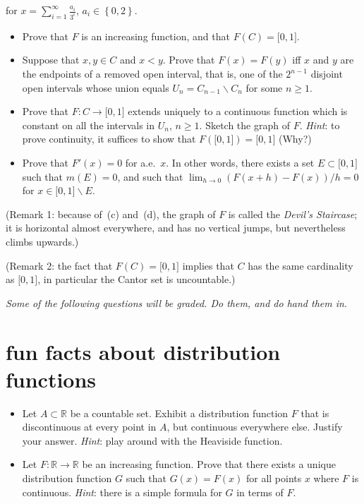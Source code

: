 \documentclass{qlnotes-export}
\begin{document}
for \(x = \sum_{i = 1}^{\infty}\frac{a_{i}}{3^{i}}\), \(a_{i} \in \left\{ {0,2} \right\}\).

\begin{itemize}
\item
  Prove that \(F\) is an increasing function, and that \(F(C) = \lbrack 0,1\rbrack\).
\item
  Suppose that \(x,y \in C\) and \(x < y\). Prove that \(F(x) = F(y)\) iff \(x\) and \(y\) are the endpoints of a removed open interval, that is, one of the \(2^{n - 1}\) disjoint open intervals whose union equals \(U_{n} = C_{n - 1}\backslash C_{n}\) for some \(n \geq 1\).
\item
  Prove that \(F:C\rightarrow\lbrack 0,1\rbrack\) extends uniquely to a continuous function which is constant on all the intervals in \(U_{n}\), \(n \geq 1\). Sketch the graph of \(F\). \emph{Hint}: to prove continuity, it suffices to show that \(F(\lbrack 0,1\rbrack) = \lbrack 0,1\rbrack\) (Why?)
\item
  Prove that \(F'(x) = 0\) for a.e.~\(x\). In other words, there exists a set \(E \subset \lbrack 0,1\rbrack\) such that \(m(E) = 0\), and such that \(\lim_{h\rightarrow 0}(F(x + h) - F(x))/h = 0\) for \(x \in \lbrack 0,1\rbrack\backslash E\).
\end{itemize}

(Remark 1: because of~(c) and~(d), the graph of \(F\) is called the \emph{Devil's Staircase}; it is horizontal almost everywhere, and has no vertical jumps, but nevertheless climbs upwards.)

(Remark 2: the fact that \(F(C) = \lbrack 0,1\rbrack\) implies that \(C\) has the same cardinality as \(\lbrack 0,1\rbrack\), in particular the Cantor set is uncountable.)

\emph{Some of the following questions will be graded. Do them, and do hand them in}.

\section{fun facts about distribution functions}\label{fun-facts-about-distribution-functions}

\begin{itemize}
\item
  Let \(A \subset {\mathbb{R}}\) be a countable set. Exhibit a distribution function \(F\) that is discontinuous at every point in \(A\), but continuous everywhere else. Justify your answer. \emph{Hint}: play around with the Heaviside function.
\item
  Let \(F:{\mathbb{R}}\rightarrow{\mathbb{R}}\) be an increasing function. Prove that there exists a unique distribution function \(G\) such that \(G(x) = F(x)\) for all points \(x\) where \(F\) is continuous. \emph{Hint}: there is a simple formula for \(G\) in terms of \(F\).
\end{itemize}
\end{document}
